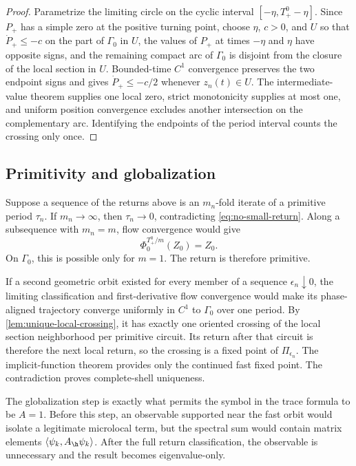 \begin{proof}
Parametrize the limiting circle on the cyclic interval
\([ -\eta,T_+^0-\eta]\).  Since \(P_+\) has a simple zero at the positive
turning point, choose \(\eta\), \(c>0\), and \(U\) so that
\(\dot P_+\le-c\) on the part of \(\Gamma_0\) in \(U\), the values of
\(P_+\) at times \(-\eta\) and \(\eta\) have opposite signs, and the
remaining compact arc of \(\Gamma_0\) is disjoint from the closure of the
local section in \(U\).  Bounded-time \(C^1\) convergence preserves the two
endpoint signs and gives \(\dot P_+\le-c/2\) whenever \(z_n(t)\in U\).
The intermediate-value theorem supplies one local zero, strict monotonicity
supplies at most one, and uniform position convergence excludes another
intersection on the complementary arc.  Identifying the endpoints of the
period interval counts the crossing only once.
\end{proof}

\subsection{Primitivity and globalization}

Suppose a sequence of the returns above is an \(m_n\)-fold iterate of a
primitive period \(\tau_n\).  If \(m_n\to\infty\), then
\(\tau_n\to0\), contradicting \cref{eq:no-small-return}.  Along a subsequence
with \(m_n=m\), flow convergence would give
\begin{equation}
 \Phi_0^{T_+^0/m}(Z_0)=Z_0.
 \label{eq:fractional-return}
\end{equation}
On \(\Gamma_0\), this is possible only for \(m=1\).  The return is therefore
primitive.

If a second geometric orbit existed for every member of a sequence
\(\epsilon_n\downarrow0\), the limiting classification and first-derivative
flow convergence would make its phase-aligned trajectory converge uniformly
in \(C^1\) to \(\Gamma_0\) over one period.  By
\cref{lem:unique-local-crossing}, it has exactly one oriented crossing of the
local section neighborhood per primitive circuit.  Its return after that
circuit is therefore the next local return, so the crossing is a fixed point
of \(\Pi_{\epsilon_n}\).  The implicit-function theorem provides only the
continued fast fixed point.  The contradiction proves complete-shell
uniqueness.

The globalization step is exactly what permits the symbol in the trace
formula to be \(A=1\).  Before this step, an observable supported near the
fast orbit would isolate a legitimate microlocal term, but the spectral sum
would contain matrix elements
\(\langle\psi_k,A_\h\psi_k\rangle\).  After the full return classification,
the observable is unnecessary and the result becomes eigenvalue-only.
